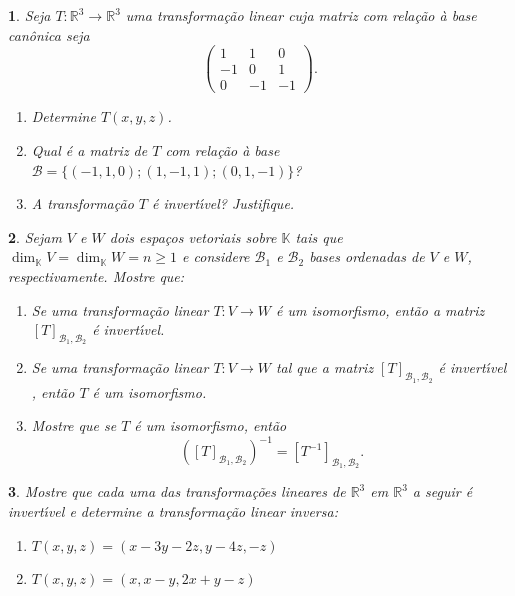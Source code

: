 \documentclass[12pt]{exam}
\newtheorem{exercicio}{}
\newcommand{\real}{\mathbb{R}}
\newcommand{\cp}[1]{\mathbb{#1}}
\begin{document}
\begin{exercicio}
  Seja $T : \real^3 \to \real^3$ uma transforma\c{c}\~ao linear cuja matriz com rela\c{c}\~ao \`a base can\^onica seja
  \[
    \begin{pmatrix}
      1 & 1 & 0\\
      -1 & 0 & 1\\
      0 & -1 & -1
    \end{pmatrix}.
  \]
    \begin{enumerate}[label=({\alph*})]
      \item Determine $T(x,y,z)$.
      \item Qual \'e a matriz de $T$ com rela\c{c}\~ao \`a base $\mathcal{B} = \{(-1,1,0);(1,-1,1);(0,1,-1)\}$?
      \item A transforma\c{c}\~ao $T$ \'e invert{\'\i}vel? Justifique.
    \end{enumerate}
\end{exercicio}

\begin{exercicio}
  Sejam $V$ e $W$ dois espa\c{c}os vetoriais sobre $\cp{K}$ tais que $\dim_\cp{K}V = \dim_\cp{K}W = n \ge 1$ e considere $\mathcal{B}_1$ e $\mathcal{B}_2$ bases ordenadas de $V$ e $W$, respectivamente. Mostre que:
  \begin{enumerate}[label=({\alph*})]
    \item Se uma transforma\c{c}\~ao linear $T : V \to W$ \'e um isomorfismo, ent\~ao a matriz $[T]_{\mathcal{B}_1,\mathcal{B}_2}$ \'e invert{\'\i}vel.
    \item Se uma transforma\c{c}\~ao linear $T : V \to W$ tal que a matriz $[T]_{\mathcal{B}_1,\mathcal{B}_2}$ \'e invert{\'\i}vel , ent\~ao $T$ \'e um isomorfismo.
    \item Mostre que se $T$ \'e um isomorfismo, ent\~ao
    \[
      \left([T]_{\mathcal{B}_1,\mathcal{B}_2}\right)^{-1} = [T^{-1}]_{\mathcal{B}_1,\mathcal{B}_2}.
    \]
  \end{enumerate}
\end{exercicio}

\begin{exercicio}
  Mostre que cada uma das transforma\c{c}\~oes lineares de $\real^3$ em $\real^3$ a seguir \'e invert{\'\i}vel e determine a transforma\c{c}\~ao linear inversa:
  \begin{enumerate}[label=({\alph*})]
    \item $T(x,y,z) = (x - 3y - 2z, y - 4z, -z)$
    \item $T(x,y,z) = (x, x - y, 2x + y -z)$
  \end{enumerate}

\end{exercicio}
\end{document}
